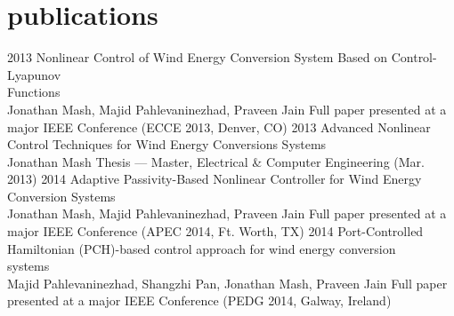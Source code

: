 \section{publications}

\begin{entrylist}
\entry
{2013}
{Nonlinear Control of Wind Energy Conversion System Based on Control-Lyapunov \\Functions}
{\\{\headingfont Jonathan Mash}, Majid Pahlevaninezhad, Praveen Jain}
{Full paper presented at a major IEEE Conference (ECCE 2013, Denver, CO)}
\entry
{2013}
{Advanced Nonlinear Control Techniques for Wind Energy Conversions Systems}
{\\{\headingfont Jonathan Mash}}
{Thesis — Master, Electrical \& Computer Engineering (Mar. 2013)}
\entry
{2014}
{Adaptive Passivity-Based Nonlinear Controller for Wind Energy \\Conversion Systems}
{\\{\headingfont Jonathan Mash}, Majid Pahlevaninezhad, Praveen Jain}
{Full paper presented at a major IEEE Conference (APEC 2014, Ft. Worth, TX)}
\entry
{2014}
{Port-Controlled Hamiltonian (PCH)-based control approach for wind energy conversion \\systems}
{\\Majid Pahlevaninezhad, Shangzhi Pan, {\headingfont Jonathan Mash}, Praveen Jain}
{Full paper presented at a major IEEE Conference (PEDG 2014, Galway, Ireland)}

\end{entrylist}